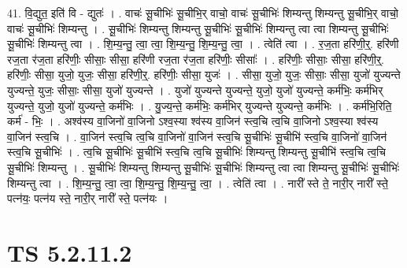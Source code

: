 \documentclass[17pt]{extarticle}
\begin{document}
41. वि॒द्युत॒ इति॑ वि - द्युतः॑ । . वाचः॑ सू॒चीभिः॑ सू॒चीभि॒र् वाचो॒ वाचः॑ सू॒चीभिः॑ शिम्यन्तु शिम्यन्तु सू॒चीभि॒र् वाचो॒ वाचः॑ सू॒चीभिः॑ शिम्यन्तु । . सू॒चीभिः॑ शिम्यन्तु शिम्यन्तु सू॒चीभिः॑ सू॒चीभिः॑ शिम्यन्तु त्वा त्वा शिम्यन्तु सू॒चीभिः॑ सू॒चीभिः॑ शिम्यन्तु त्वा । . शि॒म्य॒न्तु॒ त्वा॒ त्वा॒ शि॒म्य॒न्तु॒ शि॒म्य॒न्तु॒ त्वा॒ । . त्वेति॑ त्वा । . र॒ज॒ता हरि॑णी॒र्॒. हरि॑णी रज॒ता र॑ज॒ता हरि॑णीः॒ सीसाः॒ सीसा॒ हरि॑णी रज॒ता र॑ज॒ता हरि॑णीः॒ सीसाः᳚ । . हरि॑णीः॒ सीसाः॒ सीसा॒ हरि॑णी॒र्॒. हरि॑णीः॒ सीसा॒ युजो॒ युजः॒ सीसा॒ हरि॑णी॒र्॒. हरि॑णीः॒ सीसा॒ युजः॑ । . सीसा॒ युजो॒ युजः॒ सीसाः॒ सीसा॒ युजो॑ युज्यन्ते युज्यन्ते॒ युजः॒ सीसाः॒ सीसा॒ युजो॑ युज्यन्ते । . युजो॑ युज्यन्ते युज्यन्ते॒ युजो॒ युजो॑ युज्यन्ते॒ कर्म॑भिः॒ कर्म॑भिर् युज्यन्ते॒ युजो॒ युजो॑ युज्यन्ते॒ कर्म॑भिः । . यु॒ज्य॒न्ते॒ कर्म॑भिः॒ कर्म॑भिर् युज्यन्ते युज्यन्ते॒ कर्म॑भिः । . कर्म॑भि॒रिति॒ कर्म॑ - भिः॒ । . अश्व॑स्य वा॒जिनो॑ वा॒जिनो ऽश्व॒स्या श्व॑स्य वा॒जिन॑ स्त्व॒चि त्व॒चि वा॒जिनो ऽश्व॒स्या श्व॑स्य वा॒जिन॑ स्त्व॒चि । . वा॒जिन॑ स्त्व॒चि त्व॒चि वा॒जिनो॑ वा॒जिन॑ स्त्व॒चि सू॒चीभिः॑ सू॒चीभि॑ स्त्व॒चि वा॒जिनो॑ वा॒जिन॑ स्त्व॒चि सू॒चीभिः॑ । . त्व॒चि सू॒चीभिः॑ सू॒चीभि॑ स्त्व॒चि त्व॒चि सू॒चीभिः॑ शिम्यन्तु शिम्यन्तु सू॒चीभि॑ स्त्व॒चि त्व॒चि सू॒चीभिः॑ शिम्यन्तु । . सू॒चीभिः॑ शिम्यन्तु शिम्यन्तु सू॒चीभिः॑ सू॒चीभिः॑ शिम्यन्तु त्वा त्वा शिम्यन्तु सू॒चीभिः॑ सू॒चीभिः॑ शिम्यन्तु त्वा । . शि॒म्य॒न्तु॒ त्वा॒ त्वा॒ शि॒म्य॒न्तु॒ शि॒म्य॒न्तु॒ त्वा॒ । . त्वेति॑ त्वा । . नारी᳚ स्ते ते॒ नारी॒र् नारी᳚ स्ते॒ पत्न॑यः॒ पत्न॑य स्ते॒ नारी॒र् नारी᳚ स्ते॒ पत्न॑यः । \newline
\pagebreak
{}

\section{ TS 5.2.11.2 }
\end{document}
